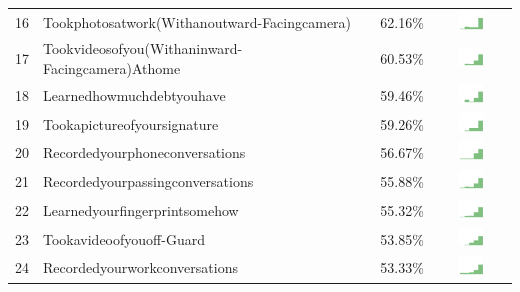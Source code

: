 \documentclass[a4paper,12pt]{article}
\begin{document}
\begin{longtable}{| p{0.5cm} | p{7cm} | p{1cm} | c |}
16 & Tookphotosatwork(Withanoutward-Facingcamera) & 62.16\% & \includegraphics[width = 2cm, height = 0.5cm]{tookphotosatwork(withanoutward-facingcamera)APPSERVER} \\ 
17 & Tookvideosofyou(Withaninward-Facingcamera)Athome & 60.53\% & \includegraphics[width = 2cm, height = 0.5cm]{tookvideosofyou(withaninward-facingcamera)athomeAPPSERVER} \\ 
18 & Learnedhowmuchdebtyouhave & 59.46\% & \includegraphics[width = 2cm, height = 0.5cm]{learnedhowmuchdebtyouhaveAPPSERVER} \\ 
19 & Tookapictureofyoursignature & 59.26\% & \includegraphics[width = 2cm, height = 0.5cm]{tookapictureofyoursignatureAPPSERVER} \\ 
20 & Recordedyourphoneconversations & 56.67\% & \includegraphics[width = 2cm, height = 0.5cm]{recordedyourphoneconversationsAPPSERVER} \\ 
21 & Recordedyourpassingconversations & 55.88\% & \includegraphics[width = 2cm, height = 0.5cm]{recordedyourpassingconversationsAPPSERVER} \\ 
22 & Learnedyourfingerprintsomehow & 55.32\% & \includegraphics[width = 2cm, height = 0.5cm]{learnedyourfingerprintsomehowAPPSERVER} \\ 
23 & Tookavideoofyouoff-Guard & 53.85\% & \includegraphics[width = 2cm, height = 0.5cm]{tookavideoofyouoff-guardAPPSERVER} \\ 
24 & Recordedyourworkconversations & 53.33\% & \includegraphics[width = 2cm, height = 0.5cm]{recordedyourworkconversationsAPPSERVER} \\ 

\end{longtable}
\end{document}
